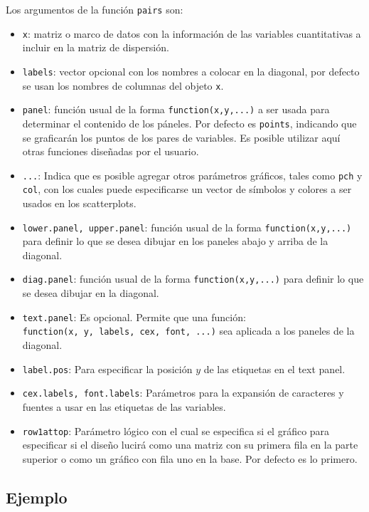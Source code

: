 \documentclass[10pt,]{krantz}
\providecommand{\tightlist}{%
  \setlength{\itemsep}{0pt}\setlength{\parskip}{0pt}}
\begin{document}
Los argumentos de la función \texttt{pairs} son:

\begin{itemize}
\tightlist
\item
  \texttt{x}: matriz o marco de datos con la información de las
  variables cuantitativas a incluir en la matriz de dispersión.
\item
  \texttt{labels}: vector opcional con los nombres a colocar en la
  diagonal, por defecto se usan los nombres de columnas del objeto
  \texttt{x}.
\item
  \texttt{panel}: función usual de la forma \texttt{function(x,y,...)} a
  ser usada para determinar el contenido de los páneles. Por defecto es
  \texttt{points}, indicando que se graficarán los puntos de los pares
  de variables. Es posible utilizar aquí otras funciones diseñadas por
  el usuario.
\item
  \texttt{...}: Indica que es posible agregar otros parámetros gráficos,
  tales como \texttt{pch} y \texttt{col}, con los cuales puede
  especificarse un vector de símbolos y colores a ser usados en los
  scatterplots.
\item
  \texttt{lower.panel,\ upper.panel}: función usual de la forma
  \texttt{function(x,y,...)} para definir lo que se desea dibujar en los
  paneles abajo y arriba de la diagonal.
\item
  \texttt{diag.panel}: función usual de la forma
  \texttt{function(x,y,...)} para definir lo que se desea dibujar en la
  diagonal.
\item
  \texttt{text.panel}: Es opcional. Permite que una función:
  \texttt{function(x,\ y,\ labels,\ cex,\ font,\ ...)} sea aplicada a
  los paneles de la diagonal.
\item
  \texttt{label.pos}: Para especificar la posición \(y\) de las
  etiquetas en el text panel.
\item
  \texttt{cex.labels,\ font.labels}: Parámetros para la expansión de
  caracteres y fuentes a usar en las etiquetas de las variables.
\item
  \texttt{row1attop}: Parámetro lógico con el cual se especifica si el
  gráfico para especificar si el diseño lucirá como una matriz con su
  primera fila en la parte superior o como un gráfico con fila uno en la
  base. Por defecto es lo primero.
\end{itemize}

\subsection*{Ejemplo}\label{ejemplo-10}
\end{document}

